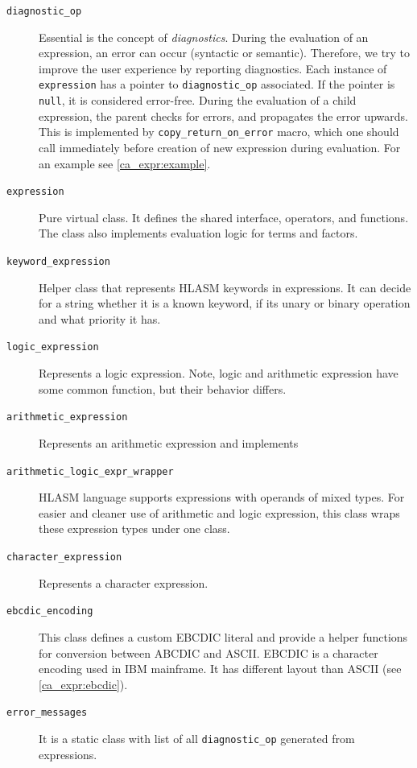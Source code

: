 \begin{description}
	\item[\texttt{diagnostic\_op}] Essential is the concept of \emph{diagnostics}. During the evaluation of an expression, an error can occur (syntactic or semantic). Therefore, we try to improve the user experience by reporting diagnostics. Each instance of \texttt{expression} has a pointer to \texttt{diagnostic\_op} associated. If the pointer is \texttt{null}, it is considered error-free. During the evaluation of a child expression, the parent checks for errors, and propagates the error upwards. This is implemented by \texttt{copy\_return\_on\_error} macro, which one should call immediately before creation of new expression during evaluation. For an example see \cref{ca_expr:example}. 
	
	\item[\texttt{expression}] Pure virtual class. It defines the shared interface, operators, and functions. The class also implements evaluation logic for terms and factors. 
	
	\item[\texttt{keyword\_expression}] Helper class that represents HLASM keywords in expressions. It can decide for a string whether it is a known keyword, if its unary or binary operation and what priority it has.
	
	\item[\texttt{logic\_expression}] Represents a logic expression. Note, logic and arithmetic expression have some common function, but their behavior differs. 
	
	\item[\texttt{arithmetic\_expression}] Represents an arithmetic expression and implements 
	
	\item[\texttt{arithmetic\_logic\_expr\_wrapper}] HLASM language supports expressions with operands of mixed types. For easier and cleaner use of arithmetic and logic expression, this class wraps these expression types under one class.
	
	\item[\texttt{character\_expression}] Represents a character expression.
	
	\item[\texttt{ebcdic\_encoding}] This class defines a custom EBCDIC literal and provide a helper functions for conversion between ABCDIC and ASCII. EBCDIC is a character encoding used in IBM mainframe. It has different layout than ASCII (see \cref{ca_expr:ebcdic}).
	
	\item[\texttt{error\_messages}] It is a static class with list of all \texttt{diagnostic\_op} generated from expressions.
	
	
\end{description}

